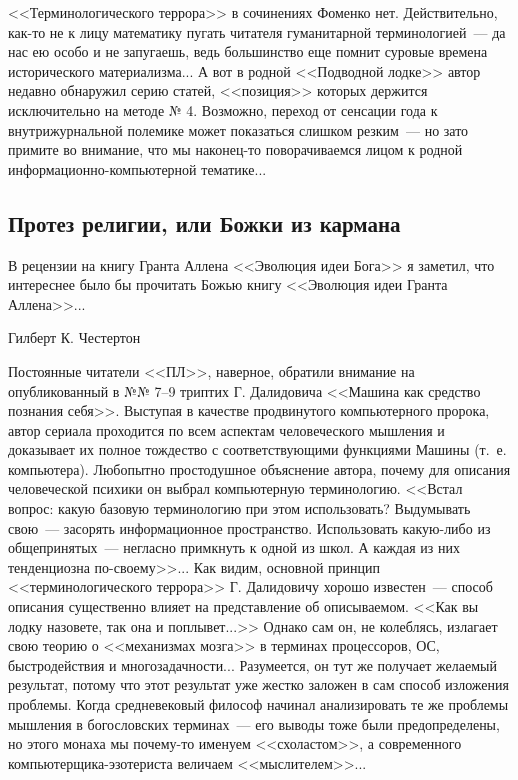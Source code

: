 \documentclass{scrbook}
\makeatletter
\newcommand{\isAFourOneside}{\boolexpr{\value{bookformat} = \value{bfAFourOneside}}}
\newcommand{\isAFourTwoside}{\boolexpr{\value{bookformat} = \value{bfAFourTwoside}}}
\newcommand{\isAFour}{\boolexpr{\isAFourOneside \OR \isAFourTwoside}}
\newcommand{\defaultepigraphwidth}{0.5} %
\newcommand{\flqq}{<<}
\newcommand{\frqq}{>>}
\newcommand{\mdash}{~--- }
\newcommand{\ndash}{--}
\newcommand{\essaysection}[1]{\subsection*{#1}\nopagebreak}
\newcommand{\myepigraph}[3][\@empty]{
	\ifx\@empty#1
		\setlength{\epigraphwidth}{\defaultepigraphwidth\textwidth}
	\else
		\setlength{\epigraphwidth}{#1\textwidth}
	\fi
	\epigraph{#2}{#3}
	\setlength{\epigraphwidth}{\defaultepigraphwidth\textwidth} %
	\nopagebreak
}
\makeatother
\begin{document}
{\flqq}Терминологического террора{\frqq} в сочинениях Фоменко нет. Действительно, как-то не к лицу математику пугать читателя гуманитарной терминологией{\mdash}да нас ею особо и не запугаешь, ведь большинство еще помнит суровые времена исторического материализма... А вот в родной {\flqq}Подводной лодке{\frqq} автор недавно обнаружил серию статей, {\flqq}позиция{\frqq} которых держится исключительно на методе № 4. Возможно, переход от сенсации года к внутрижурнальной полемике может показаться слишком резким{\mdash}но зато примите во внимание, что мы наконец-то поворачиваемся лицом к родной информационно-компьютерной тематике...

\ifcase\isAFour
	\pagebreak 
\fi

\essaysection{Протез религии, или Божки из кармана}

\myepigraph{В рецензии на книгу Гранта Аллена {\flqq}Эволюция идеи Бога{\frqq} я заметил, что интереснее было бы прочитать Божью книгу {\flqq}Эволюция идеи Гранта Аллена{\frqq}...}
{Гилберт К. Честертон}

Постоянные читатели {\flqq}ПЛ{\frqq}, наверное, обратили внимание на опубликованный в №№ 7{\ndash}9 триптих Г. Далидовича {\flqq}Машина как средство познания себя{\frqq}. Выступая в качестве продвинутого компьютерного пророка, автор сериала проходится по всем аспектам человеческого мышления и доказывает их полное тождество с соответствующими функциями Машины (т.~е. компьютера). Любопытно простодушное объяснение автора, почему для описания человеческой психики он выбрал компьютерную терминологию. {\flqq}Встал вопрос: какую базовую терминологию при этом использовать? Выдумывать свою{\mdash}засорять информационное пространство. Использовать какую-либо из общепринятых{\mdash}негласно примкнуть к одной из школ. А каждая из них тенденциозна по-своему{\frqq}... Как видим, основной принцип {\flqq}терминологического террора{\frqq} Г. Далидовичу хорошо известен{\mdash}способ описания существенно влияет на представление об описываемом. {\flqq}Как вы лодку назовете, так она и поплывет...{\frqq} Однако сам он, не колеблясь, излагает свою теорию о {\flqq}механизмах мозга{\frqq} в терминах процессоров, ОС, быстродействия и многозадачности... Разумеется, он тут же получает желаемый результат, потому что этот результат уже жестко заложен в сам способ изложения проблемы. Когда средневековый философ начинал анализировать те же проблемы мышления в богословских терминах{\mdash}его выводы тоже были предопределены, но этого монаха мы почему-то именуем {\flqq}схоластом{\frqq}, а современного компьютерщика-эзотериста величаем {\flqq}мыслителем{\frqq}...
\end{document}
